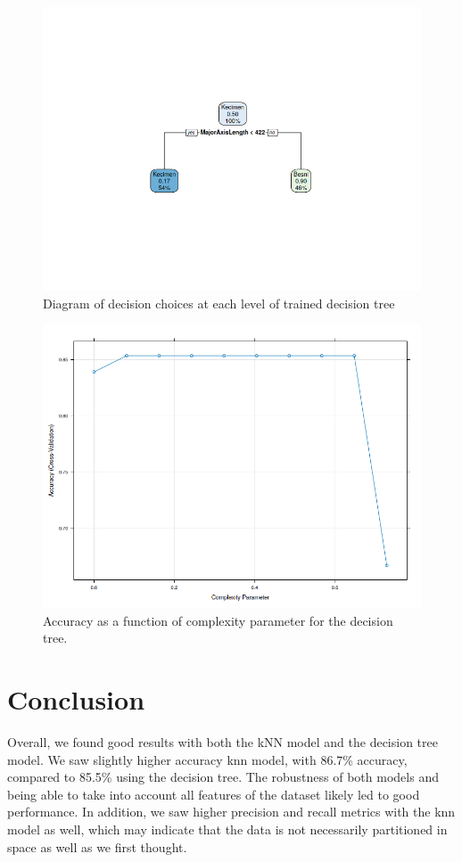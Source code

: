 \documentclass{article}
\begin{document}
\begin{figure}[h]
    \centering
    \includegraphics[width=.7\linewidth]{tree_plot}
    \caption{Diagram of decision choices at each level of trained decision tree}
    \label{fig:tree_plot}
\end{figure}
\begin{figure}[!h]
	\centering
	\includegraphics[width=\linewidth]{tree_cv_plot}
	\caption{Accuracy as a function of complexity parameter for the decision tree.}
	\label{fig:tree_cv}
\end{figure}


\clearpage
\section*{Conclusion}

Overall, we found good results with both the kNN model and the decision tree model. We saw slightly higher accuracy knn model, with 86.7\% accuracy, compared to 85.5\% using the decision tree. The robustness of both models and being able to take into account all features of the dataset likely led to good performance. In addition, we saw higher precision and recall metrics with the knn model as well, which may indicate that the data is not necessarily partitioned in space as well as we first thought.
\end{document}
